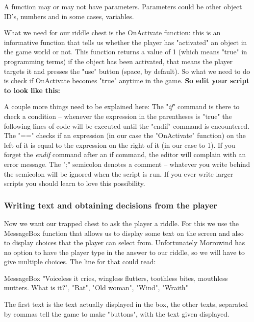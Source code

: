 \documentclass[
]{article}
\begin{document}
A function may or may not have parameters. Parameters could be other
object ID's, numbers and in some cases, variables.

What we need for our riddle chest is the OnActivate function: this is an
informative function that tells us whether the player has "activated" an
object in the game world or not. This function returns a value of 1
(which means "true" in programming terms) if the object has been
activated, that means the player targets it and presses the "use" button
(space, by default). So what we need to do is check if OnActivate
becomes "true" anytime in the game. \textbf{So edit your script to look
like this:}



A couple more things need to be explained here: The "\emph{if}" command
is there to check a condition -- whenever the expression in the
parentheses is "true" the following lines of code will be executed until
the "endif" command is encountered. The "==" checks if an expression (in
our case the "OnActivate" function) on the left of it is equal to the
expression on the right of it (in our case to 1). If you forget the
\emph{endif} command after an if command, the editor will complain with
an error message. The ";" semicolon denotes a comment -- whatever you
write behind the semicolon will be ignored when the script is run. If
you ever write larger scripts you should learn to love this possibility.

\hypertarget{writing-text-and-obtaining-decisions-from-the-player}{%
\subsubsection{Writing text and obtaining decisions from the
player}\label{writing-text-and-obtaining-decisions-from-the-player}}

Now we want our trapped chest to ask the player a riddle. For this we
use the MessageBox function that allows us to display some text on the
screen and also to display choices that the player can select from.
Unfortunately Morrowind has no option to have the player type in the
answer to our riddle, so we will have to give multiple choices. The line
for that could read:

MessageBox "Voiceless it cries, wingless flutters, toothless bites,
mouthless mutters. What is it?", "Bat", "Old woman", "Wind", "Wraith"

The first text is the text actually displayed in the box, the other
texts, separated by commas tell the game to make "buttons", with the
text given displayed.
\end{document}
